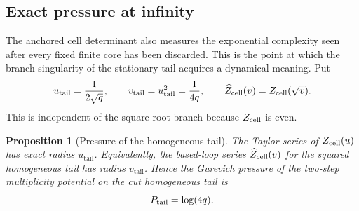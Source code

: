 \documentclass[11pt,reqno]{amsart}
\numberwithin{equation}{section}
\newtheorem{proposition}[theorem]{Proposition}
\theoremstyle{definition}
\theoremstyle{remark}
\begin{document}
\subsection{Exact pressure at infinity}
\label{sec:exact-pressure-infinity}

The anchored cell determinant also measures the exponential complexity seen
after every fixed finite core has been discarded.  This is the point at which
the branch singularity of the stationary tail acquires a dynamical meaning.
Put
\[
 u_{\mathrm{tail}}=\frac1{2\sqrt q},
 \qquad v_{\mathrm{tail}}=u_{\mathrm{tail}}^2=\frac1{4q},
 \qquad
 \widehat Z_{\rm cell}(v)=Z_{\rm cell}(\sqrt v).
\]
This is independent of the square-root branch because $Z_{\rm cell}$ is even.

\begin{proposition}[Pressure of the homogeneous tail]
\label{prop:homogeneous-tail-pressure}
The Taylor series of $Z_{\rm cell}(u)$ has exact radius
$u_{\mathrm{tail}}$.  Equivalently, the based-loop series
$\widehat Z_{\rm cell}(v)$ for the squared homogeneous tail has radius
$v_{\mathrm{tail}}$.  Hence the Gurevich pressure of the two-step
multiplicity potential on the cut homogeneous tail is
\begin{equation}\label{eq:tail-pressure}
 P_{\rm tail}=\log(4q).
\end{equation}
\end{proposition}
\end{document}
